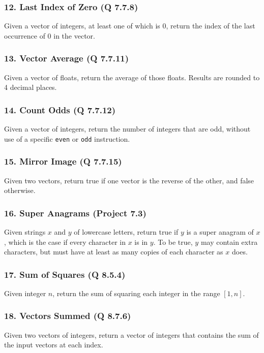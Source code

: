 \documentclass{sig-alternate}
\begin{document}
\subsubsection*{12. Last Index of Zero (Q 7.7.8)}
Given a vector of integers, at least one of which is 0, return the index of the last occurrence of 0 in the vector.

\subsubsection*{13. Vector Average (Q 7.7.11)}
Given a vector of floats, return the average of those floats. Results are rounded to 4 decimal places.

\subsubsection*{14. Count Odds (Q 7.7.12)}
Given a vector of integers, return the number of integers that are odd, without use of a specific \texttt{even} or \texttt{odd} instruction.

\subsubsection*{15. Mirror Image (Q 7.7.15)}
Given two vectors, return true if one vector is the reverse of the other, and false otherwise.

\subsubsection*{16. Super Anagrams (Project 7.3)}
Given strings $x$ and $y$ of lowercase letters, return true if $y$ is a super anagram of $x$, which is the case if every character in $x$ is in $y$. To be true, $y$ may contain extra characters, but must have at least as many copies of each character as $x$ does.

\subsubsection*{17. Sum of Squares (Q 8.5.4)}
Given integer $n$, return the sum of squaring each integer in the range $[1, n]$.

\subsubsection*{18. Vectors Summed (Q 8.7.6)}
Given two vectors of integers, return a vector of integers that contains the sum of the input vectors at each index.
\end{document}
